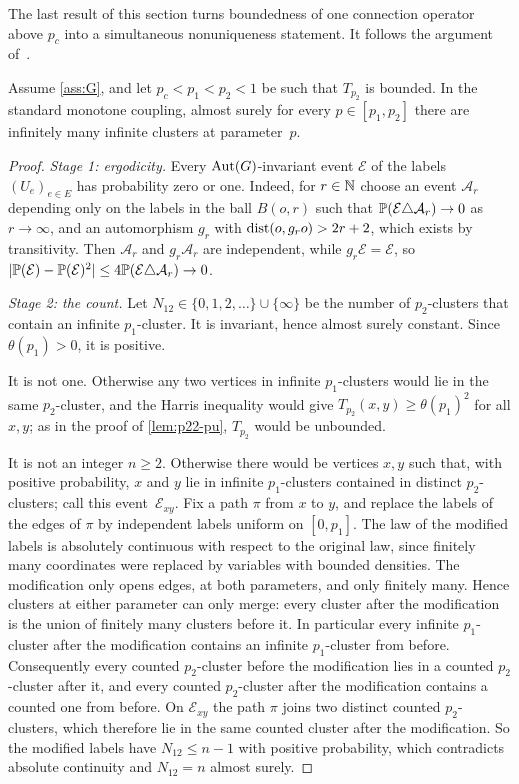 The last result of this section turns boundedness of one connection operator above $p_c$ into a
simultaneous nonuniqueness statement. It follows the argument of~\cite{Ope26}.

\begin{proposition}\label{prop:interval}
Assume \cref{ass:G}, and let $p_c<p_1<p_2<1$ be such that $T_{p_2}$ is bounded. In the standard
monotone coupling, almost surely for every $p\in[p_1,p_2]$ there are infinitely many infinite clusters
at parameter~$p$.
\end{proposition}

\begin{proof}
\emph{Stage 1: ergodicity.} Every $\operatorname{Aut}(G)$-invariant event $\mathcal E$ of the labels $(U_e)_{e\in E}$
has probability zero or one. Indeed, for $r\in\mathbb N$ choose an event $\mathcal A_r$ depending only on the
labels in the ball $B(o,r)$ such that $\mathbb P(\mathcal E\triangle\mathcal A_r)\to0$ as $r\to\infty$, and an
automorphism $g_r$ with $\operatorname{dist}(o,g_ro)>2r+2$, which exists by transitivity. Then $\mathcal A_r$ and
$g_r\mathcal A_r$ are independent, while $g_r\mathcal E=\mathcal E$, so
$\lvert\mathbb P(\mathcal E)-\mathbb P(\mathcal E)^2\rvert\le4\mathbb P(\mathcal E\triangle\mathcal A_r)\to0$.

\emph{Stage 2: the count.} Let $N_{12}\in\{0,1,2,\dots\}\cup\{\infty\}$ be the number of
$p_2$-clusters that contain an infinite $p_1$-cluster. It is invariant, hence almost surely constant.
Since $\theta(p_1)>0$, it is positive.

It is not one. Otherwise any two vertices in infinite $p_1$-clusters would lie in the same
$p_2$-cluster, and the Harris inequality would give $T_{p_2}(x,y)\ge\theta(p_1)^2$ for all $x,y$; as
in the proof of \cref{lem:p22-pu}, $T_{p_2}$ would be unbounded.

It is not an integer $n\ge2$. Otherwise there would be vertices $x,y$ such that, with positive
probability, $x$ and $y$ lie in infinite $p_1$-clusters contained in distinct $p_2$-clusters; call
this event~$\mathcal E_{xy}$. Fix a path $\pi$ from $x$ to $y$, and replace the labels of the edges of
$\pi$ by independent labels uniform on $[0,p_1]$. The law of the modified labels is absolutely
continuous with respect to the original law, since finitely many coordinates were replaced by
variables with bounded densities. The modification only opens edges, at both parameters, and only
finitely many. Hence clusters at either parameter can only merge: every cluster after the modification
is the union of finitely many clusters before it. In particular every infinite $p_1$-cluster after the
modification contains an infinite $p_1$-cluster from before. Consequently every counted $p_2$-cluster
before the modification lies in a counted $p_2$-cluster after it, and every counted $p_2$-cluster after
the modification contains a counted one from before. On $\mathcal E_{xy}$ the path $\pi$ joins two
distinct counted $p_2$-clusters, which therefore lie in the same counted cluster after the modification.
So the modified labels have $N_{12}\le n-1$ with positive probability, which contradicts absolute
continuity and $N_{12}=n$ almost surely.


\end{proof}
